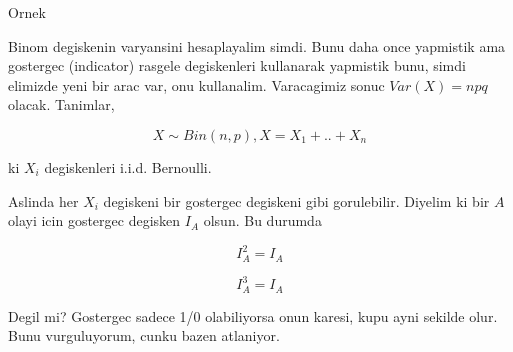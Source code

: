 \documentclass[12pt,fleqn]{article}\usepackage{../common}
\begin{document}
Ornek

Binom degiskenin varyansini hesaplayalim simdi. Bunu daha once yapmistik
ama gostergec (indicator) rasgele degiskenleri kullanarak yapmistik bunu,
simdi elimizde yeni bir arac var, onu kullanalim. Varacagimiz sonuc 
$Var(X) = npq$ olacak. Tanimlar,

$$ X \sim Bin(n,p), X = X_1+..+X_n $$

ki $X_i$ degiskenleri i.i.d. Bernoulli. 

Aslinda her $X_i$ degiskeni bir gostergec degiskeni gibi
gorulebilir. Diyelim ki bir $A$ olayi icin gostergec degisken $I_A$
olsun. Bu durumda

$$ I_A^2 = I_A $$

$$ I_A^3 = I_A $$

Degil mi? Gostergec sadece 1/0 olabiliyorsa onun karesi, kupu ayni sekilde
olur. Bunu vurguluyorum, cunku bazen atlaniyor. 
\end{document}
